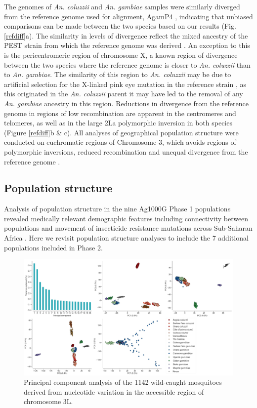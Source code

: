 \documentclass[a4paper,11pt,abstracton,hidelinks]{scrartcl}
\begin{document}
The genomes of \textit{An. coluzzii} and \textit{An. gambiae} samples were similarly diverged from the reference genome used for alignment, AgamP4 \cite{Holt2002}, indicating that unbiased comparisons can be made between the two species based on our results (Fig. \ref{refdiff}a).
%
The similarity in levels of divergence reflect the mixed ancestry of the PEST strain from which the reference genome was derived \cite{Holt2002}.
%
An exception to this is the pericentromeric region of chromosome X, a known region of divergence between the two species \cite{Ag1000gConsortium2017} where the reference genome is closer to \textit{An. coluzzii} than to \textit{An. gambiae}.
%
The similarity of this region to \textit{An. coluzzii} may be due to artificial selection for the X-linked pink eye mutation in the reference strain \cite{Holt2002}, as this originated in the \textit{An. coluzzii} parent it may have led to the removal of any \textit{An. gambiae} ancestry in this region.
%
Reductions in divergence from the reference genome in regions of low recombination are apparent in the centromeres and telomeres, as well as in the large 2La polymorphic inversion in both species \cite{coluzzi2002} (Figure \ref{refdiff}b \& c). 
%
All analyses of geographical population structure were conducted on euchromatic regions of Chromosome 3, which avoids regions of polymorphic inversions, reduced recombination and unequal divergence from the reference genome \cite{Ag1000gConsortium2017}.


\subsection*{Population structure}

Analysis of population structure in the nine Ag1000G Phase 1 populations revealed medically relevant demographic features including connectivity between populations and movement of insecticide resistance mutations across Sub-Saharan Africa \cite{Ag1000gConsortium2017}.
% 
Here we revisit population structure analyses to include the 7 additional populations included in Phase 2.

\begin{figure}[H]
	\begin{center}
		\includegraphics*[width=6.3in]{artwork/main_pca.jpeg}
	\end{center}
	\caption{Principal component analysis of the 1142 wild-caught mosquitoes derived from nucleotide variation in the accessible region of chromosome 3L.}
	\label{pca}
\end{figure}
\end{document}
